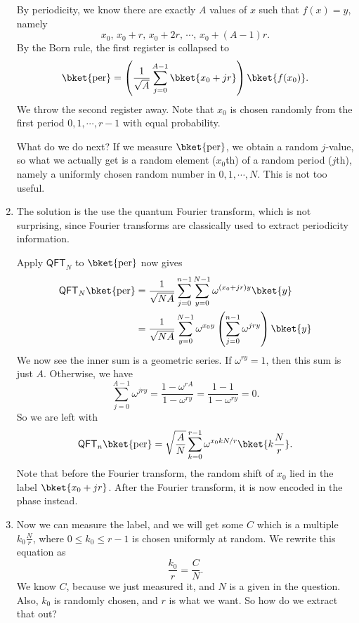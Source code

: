 \documentclass[a4paper]{article}
\newcommand{\qQFT}{\mathsf{QFT}}
\begin{document}
\begin{eg}
\begin{enumerate}
      By periodicity, we know there are exactly $A$ values of $x$ such that $f(x) = y$, namely
      \[
        x_0,\, x_0 + r,\, x_0 + 2r,\, \cdots,\, x_0 + (A - 1)r.
      \]
      By the Born rule, the first register is collapsed to
      \[
        \bket{\mathrm{per}} = \left(\frac{1}{\sqrt{A}} \sum_{j = 0}^{A - 1} \bket{x_0 + jr}\right) \bket{f(x_0)}.
      \]
      We throw the second register away. Note that $x_0$ is chosen randomly from the first period $0, 1, \cdots, r - 1$ with equal probability.

      What do we do next? If we measure $\bket{\mathrm{per}}$, we obtain a random $j$-value, so what we actually get is a random element ($x_0$th) of a random period ($j$th), namely a uniformly chosen random number in $0, 1, \cdots, N$. This is not too useful.

    \item The solution is the use the quantum Fourier transform, which is not surprising, since Fourier transforms are classically used to extract periodicity information.

      Apply $\qQFT_N$ to $\bket{\mathrm{per}}$ now gives
      \begin{align*}
        \qQFT_N \bket{\mathrm{per}} &= \frac{1}{\sqrt{NA}} \sum_{j = 0}^{n - 1} \sum_{y = 0}^{N - 1} \omega^{(x_0 + jr) y} \bket{y}\\
        &= \frac{1}{\sqrt{NA}} \sum_{y = 0}^{N - 1} \omega^{x_0 y}\left(\sum_{j = 0}^{n - 1}\omega^{jry}\right) \bket{y}
      \end{align*}
      We now see the inner sum is a geometric series. If $\omega^{ry} = 1$, then this sum is just $A$. Otherwise, we have
      \[
        \sum_{j = 0}^{A - 1} \omega^{jry} = \frac{1 - \omega^{rA}}{1 - \omega^{ry}} = \frac{1 - 1}{1 - \omega^{ry}} = 0.
      \]
      So we are left with
      \[
        \qQFT_n \bket{\mathrm{per}} = \sqrt{\frac{A}{N}} \sum_{k = 0}^{r - 1}\omega ^{x_0 k N/r} \bket{k\frac{N}{r}}.
      \]
      Note that before the Fourier transform, the random shift of $x_0$ lied in the label $\bket{x_0 + jr}$. After the Fourier transform, it is now encoded in the phase instead.

    \item Now we can measure the label, and we will get some $C$ which is a multiple $k_0 \frac{N}{r}$, where $0 \leq k_0 \leq r - 1$ is chosen uniformly at random. We rewrite this equation as
      \[
        \frac{k_0}{r} = \frac{C}{N}.
      \]
      We know $C$, because we just measured it, and $N$ is a given in the question. Also, $k_0$ is randomly chosen, and $r$ is what we want. So how do we extract that out?


\end{enumerate}
\end{eg}
\end{document}
